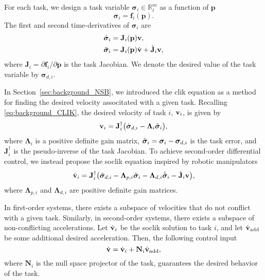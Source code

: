 For each task, we design a task variable $\bm{\sigma}_i \in \mathbb{R}^m_i$ as a function of $\mathbf{p}$
\begin{equation}
    \bm{\sigma}_i = \mathbf{f}_i(\mathbf{p}).
\end{equation}
The first and second time-derivatives of $\bm{\sigma}_i$ are
\begin{subequations}\label{eq:task_derivatives}
    \begin{align}
        \dot{\bm{\sigma}}_i &= \mathbf{J}_i(\mathbf{p})\mathbf{v},\\
        \ddot{\bm{\sigma}}_i &= \mathbf{J}_i(\mathbf{p})\dot{\mathbf{v}} + \dot{\mathbf{J}}_i \mathbf{v},\label{eq:task_second_derivative}
    \end{align}
\end{subequations}
where $\mathbf{J}_i = \partial \mathbf{f}_i/\partial \mathbf{p}$ is the task Jacobian. We denote the desired value of the task variable by $\bm{\sigma}_{d, i}$.

In Section~\ref{sec:background_NSB}, we introduced the \acrfull{clik} equation as a method for finding the desired velocity associtated with a given task.
Recalling \eqref{eq:background_CLIK}, the desired velocity of task $i$, $\mathbf{v}_i$, is given by
\begin{equation}
    \mathbf{v}_i = \mathbf{J}_i^\dagger\bigl(\dot{\bm{\sigma}}_{d, i} - \bm{\Lambda}_i \Tilde{\bm{\sigma}}_i\bigr),
\end{equation}
where $\bm{\Lambda}_i$ is a positive definite gain matrix, $\Tilde{\bm{\sigma}}_i = \bm{\sigma}_i - \bm{\sigma}_{d,i}$ is the task error, and $\mathbf{J}_i^\dagger$ is the pseudo-inverse of the task Jacobian. 
To achieve second-order differential control, we instead propose the \gls{soclik} equation inspired by robotic manipulators \cite{siciliano_closed-loop_1990}
\begin{equation}
    \dot{\mathbf{v}}_i = \mathbf{J}_i^\dagger \bigl(\ddot{\bm{\sigma}}_{d,i} - \mathbf{\Lambda}_{p,i}\Tilde{\bm{\sigma}}_i - \mathbf{\Lambda}_{d,i} \dot{\Tilde{\bm{\sigma}}}_i - \dot{\mathbf{J}}_i \mathbf{v}\bigl), \label{eq:general_acceleration}
\end{equation}
where $\mathbf{\Lambda}_{p,i}$ and $\mathbf{\Lambda}_{d,i}$ are positive definite gain matrices.

In first-order systems, there exists a subspace of velocities that do not conflict with a given task.
Similarly, in second-order systems, there exists a subspace of non-conflicting accelerations.
Let $\dot{\mathbf{v}}_i$ be the \gls{soclik} solution to task $i$, and let $\dot{\mathbf{v}}_{\rm add}$ be some additional desired acceleration.
Then, the following control input
\begin{equation}
    \dot{\mathbf{v}} = \dot{\mathbf{v}}_i +\mathbf{N}_i \dot{\mathbf{v}}_{\rm add},
    \label{eq:NSB_two_tasks}
\end{equation}
where $\mathbf{N}_i$ is the null space projector of the task, guarantees the desired behavior of the task.

